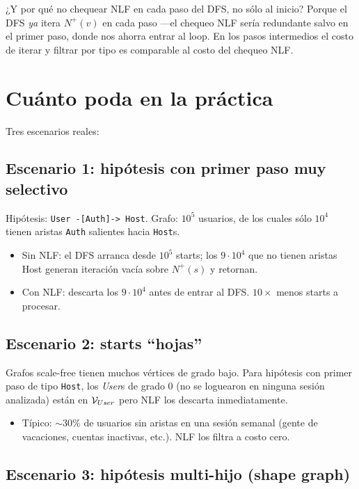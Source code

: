 ¿Y por qué no chequear NLF en cada paso del DFS, no sólo al
inicio? Porque el DFS \emph{ya} itera \(N^{+}(v)\) en cada paso ---el
chequeo NLF sería redundante salvo en el primer paso, donde nos
ahorra entrar al loop. En los pasos intermedios el costo de iterar
y filtrar por tipo es comparable al costo del chequeo NLF.

\section{Cuánto poda en la práctica}

Tres escenarios reales:

\subsection{Escenario 1: hipótesis con primer paso muy selectivo}

Hipótesis: \texttt{User -[Auth]-> Host}. Grafo: \(10^5\) usuarios,
de los cuales sólo \(10^4\) tienen aristas \texttt{Auth}
salientes hacia \texttt{Host}s.

\begin{itemize}
    \item Sin NLF: el DFS arranca desde \(10^5\) starts; los
    \(9 \cdot 10^4\) que no tienen aristas Host generan iteración
    vacía sobre \(N^{+}(s)\) y retornan.
    \item Con NLF: descarta los \(9 \cdot 10^4\) antes de entrar al
    DFS. \(10\times\) menos starts a procesar.
\end{itemize}

\subsection{Escenario 2: starts ``hojas''}

Grafos scale-free tienen muchos vértices de grado bajo. Para
hipótesis con primer paso de tipo \texttt{Host}, los \emph{User}s
de grado 0 (no se loguearon en ninguna sesión analizada) están en
\(\mathcal{V}_{User}\) pero NLF los descarta inmediatamente.

\begin{itemize}
    \item Típico: \(\sim 30\%\) de usuarios sin aristas en una
    sesión semanal (gente de vacaciones, cuentas inactivas, etc.).
    NLF los filtra a costo cero.
\end{itemize}

\subsection{Escenario 3: hipótesis multi-hijo (shape graph)}

